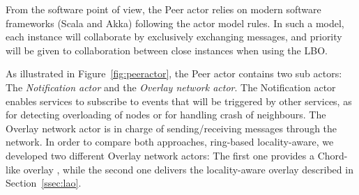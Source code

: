 From the software point of view, the Peer actor relies on modern software frameworks (Scala
and Akka) following the actor model rules. In such a model, each instance will
collaborate by exclusively exchanging messages, and priority will be given to collaboration
between close instances when using the LBO.

%

As illustrated in Figure~\ref{fig:peeractor}, the Peer actor contains two sub actors: The
\emph{Notification actor} and the \emph{Overlay network actor}. The Notification actor
enables services to subscribe to events that will be triggered by other services, as for detecting
overloading of nodes or for handling crash of neighbours. The
Overlay network actor is in charge of sending/receiving messages through the network. In order
to compare both approaches, ring-based \vs locality-aware, we developed two different
Overlay network actors: The first one provides a Chord-like overlay
\cite{stoica2001chord}, while the second one delivers the locality-aware overlay described
in Section~\ref{ssec:lao}.

